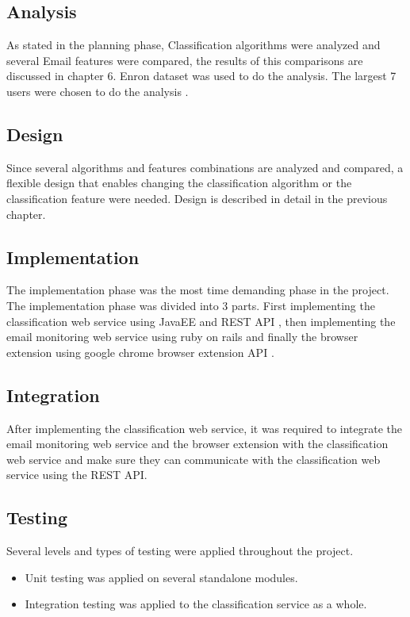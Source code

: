 \subsection{Analysis}
As stated in the planning phase, Classification algorithms were analyzed and 
several Email features were compared, the results of this comparisons are 
discussed in chapter 6. Enron dataset was used to do the analysis. The largest 7 
users were chosen to do the analysis \cite{RON04}.

\subsection{Design}
Since several algorithms and features combinations are analyzed and compared, 
a flexible design that enables changing the classification algorithm or the 
classification feature were needed. Design is described in detail in the previous 
chapter.

\subsection{Implementation}
The implementation phase was the most time demanding phase in the project. The 
implementation phase was divided into 3 parts. First implementing the 
classification web service using JavaEE and REST API \cite{REST},
then implementing the email monitoring web service using ruby on rails \cite{ROR}
and finally the browser extension using google chrome browser extension API \cite{CHROME}.

\subsection{Integration}
After implementing the classification web service,
it was required to integrate the email monitoring web service and the browser extension with
the classification web service and make sure they can communicate with the classification web
service using the REST API.

\subsection{Testing}
Several levels and types of testing were applied throughout the project.
\begin{itemize}
  \item Unit testing was applied on several standalone modules.
  \item Integration testing was applied to the classification service as a whole.
\end{itemize}

